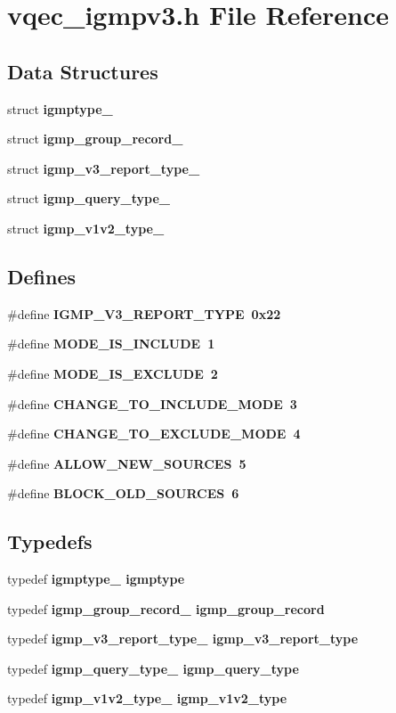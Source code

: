 \section{vqec\_\-igmpv3.h File Reference}
\label{vqec__igmpv3_8h}
\subsection*{Data Structures}
\begin{CompactItemize}
\item 
struct \bf{igmptype\_\-}
\item 
struct \bf{igmp\_\-group\_\-record\_\-}
\item 
struct \bf{igmp\_\-v3\_\-report\_\-type\_\-}
\item 
struct \bf{igmp\_\-query\_\-type\_\-}
\item 
struct \bf{igmp\_\-v1v2\_\-type\_\-}
\end{CompactItemize}
\subsection*{Defines}
\begin{CompactItemize}
\item 
\#define \bf{IGMP\_\-V3\_\-REPORT\_\-TYPE}~0x22
\item 
\#define \bf{MODE\_\-IS\_\-INCLUDE}~1
\item 
\#define \bf{MODE\_\-IS\_\-EXCLUDE}~2
\item 
\#define \bf{CHANGE\_\-TO\_\-INCLUDE\_\-MODE}~3
\item 
\#define \bf{CHANGE\_\-TO\_\-EXCLUDE\_\-MODE}~4
\item 
\#define \bf{ALLOW\_\-NEW\_\-SOURCES}~5
\item 
\#define \bf{BLOCK\_\-OLD\_\-SOURCES}~6
\end{CompactItemize}
\subsection*{Typedefs}
\begin{CompactItemize}
\item 
typedef \bf{igmptype\_\-} \bf{igmptype}
\item 
typedef \bf{igmp\_\-group\_\-record\_\-} \bf{igmp\_\-group\_\-record}
\item 
typedef \bf{igmp\_\-v3\_\-report\_\-type\_\-} \bf{igmp\_\-v3\_\-report\_\-type}
\item 
typedef \bf{igmp\_\-query\_\-type\_\-} \bf{igmp\_\-query\_\-type}
\item 
typedef \bf{igmp\_\-v1v2\_\-type\_\-} \bf{igmp\_\-v1v2\_\-type}
\end{CompactItemize}
